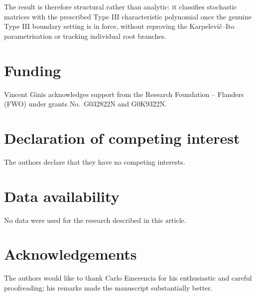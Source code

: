 \documentclass[11pt]{article}
\numberwithin{equation}{section}
\begin{document}
The result is therefore structural rather than analytic: it classifies
stochastic matrices with the prescribed Type III characteristic polynomial
once the genuine Type III boundary setting is in force, without reproving the
Karpelevi\v{c}--Ito parametrisation or tracking individual root branches.

\section*{Funding}

Vincent Ginis acknowledges support from the Research Foundation -- Flanders
(FWO) under grants No.~G032822N and G0K9322N.

\section*{Declaration of competing interest}

The authors declare that they have no competing interests.

\section*{Data availability}

No data were used for the research described in this article.

\section*{Acknowledgements}

The authors would like to thank Carlo Emerencia for his enthusiastic and
careful proofreading; his remarks made the manuscript substantially better.
\end{document}
